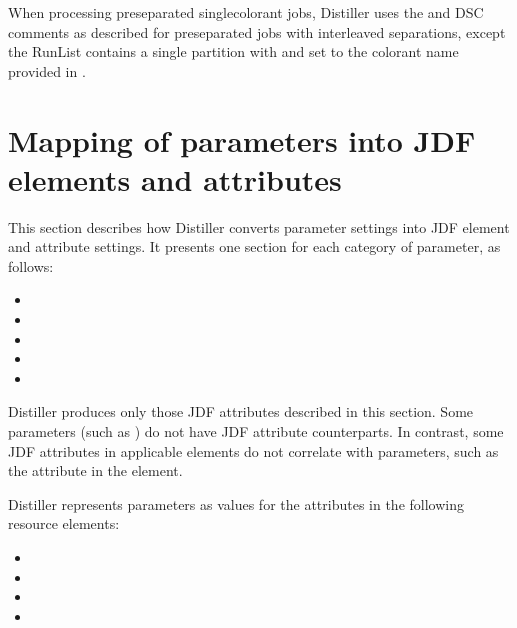 \documentclass[letterpaper,12pt,english,openany,oneside]{sphinxmanual}
\begin{document}
When processing pre\sphinxhyphen{}separated single\sphinxhyphen{}colorant jobs, Distiller uses the  and  DSC comments as described for pre\sphinxhyphen{}separated jobs with interleaved separations, except the RunList contains a single partition with  and  set to the colorant name provided in  .




\section{Mapping of parameters into JDF elements and attributes}
\label{\detokenize{PDF_Create_JDF:mapping-of-parameters-into-jdf-elements-and-attributes}}
This section describes how Distiller converts parameter settings into JDF element and attribute settings. It presents one section for each category of parameter, as follows:
\begin{itemize}
\item {} 

\item {} 

\item {} 

\item {} 

\item {} 

\end{itemize}

Distiller produces only those JDF attributes described in this section. Some parameters (such as  ) do not have JDF attribute counterparts. In contrast, some JDF attributes in applicable elements do not correlate with parameters, such as the  attribute in the  element.

Distiller represents parameters as values for the attributes in the following resource elements:
\begin{itemize}
\item {} 

\item {} 

\item {} 

\item {} 

\end{itemize}
\end{document}
